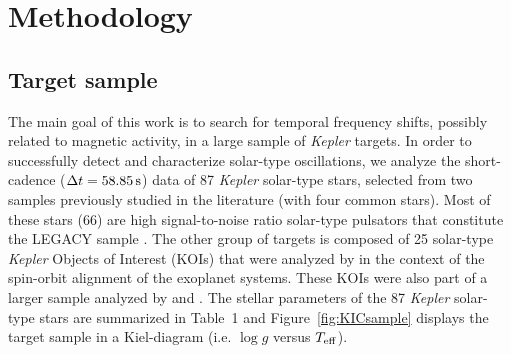 \documentclass[twocolumn]{aastex61}%
\begin{document}
\section{Methodology}\label{sec:meth}

\subsection{Target sample}

The main goal of this work is to search for temporal frequency shifts, possibly related to magnetic activity, in a large sample of {\it Kepler} targets. In order to successfully detect and characterize solar-type oscillations, we analyze the short-cadence ($\Delta t=58.85\rm\,s$) data of 87 {\it Kepler} solar-type stars, selected from two samples previously studied in the literature (with four common stars). Most of these stars (66) are high signal-to-noise ratio solar-type pulsators that constitute the LEGACY sample \citep{Lund2017,SilvaAguirre2017}. The other group of targets is composed of 25 solar-type {\it Kepler} Objects of Interest (KOIs) that were analyzed by \citet{Campante2016} in the context of the spin-orbit alignment of the exoplanet systems. These KOIs were also part of a larger sample analyzed by \citet{SilvaAguirre2015} and \citet{Davies2016}. The stellar parameters of the 87 {\it Kepler} solar-type stars are summarized in Table~1 and
Figure~\ref{fig:KICsample} displays the target sample in a Kiel-diagram (i.e. $\log g$ versus $T_{\rm eff}$).\vspace{-0.2cm}%
\end{document}
